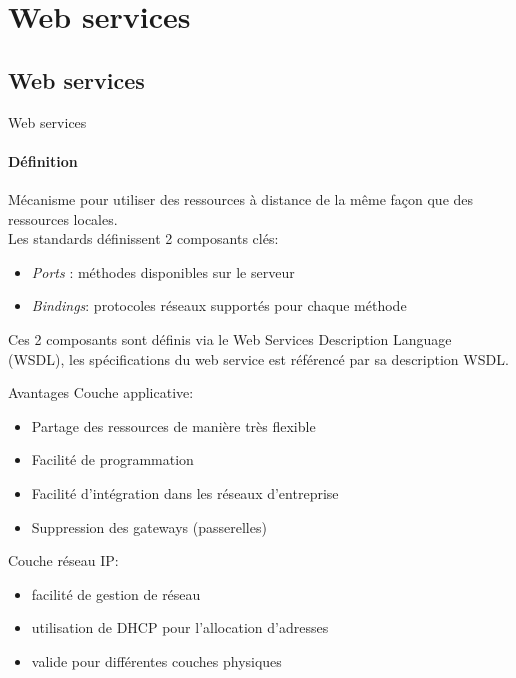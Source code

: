 \section{Web services}
\subsection{Web services}
\begin{frame}{Web services}
\framesubtitle{Définition}
Mécanisme pour utiliser des ressources à distance de la même façon que des ressources locales.\\
Les standards définissent 2 composants clés:
\begin{itemize}
\item \textit{Ports} : méthodes disponibles sur le serveur  
\item \textit{Bindings}: protocoles réseaux supportés pour chaque méthode
\end{itemize}
Ces 2 composants sont définis via le Web Services Description Language (WSDL), les spécifications du web service est référencé par sa description WSDL.
\end{frame}

\begin{frame}{Avantages}
Couche applicative:
\begin{itemize}
\item Partage des ressources de manière très flexible %
\item Facilité de programmation %
\item Facilité d’intégration dans les réseaux d’entreprise %
\item Suppression des gateways (passerelles)%
\end{itemize}
\vspace{5mm}
Couche réseau IP:
\begin{itemize}
\item facilité de gestion de réseau
\item utilisation de DHCP pour l’allocation d’adresses
\item valide pour différentes couches physiques
\end{itemize}
\end{frame}

